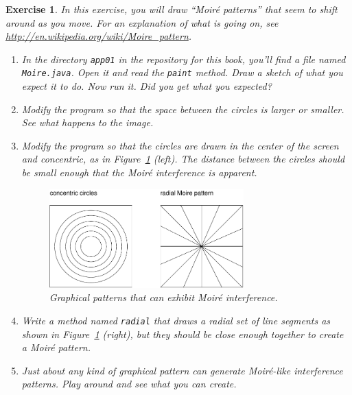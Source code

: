 \documentclass[12pt]{book}
\theoremstyle{exercise}
\newtheorem{exercise}{Exercise}[chapter]
\newcommand{\java}[1]{\verb"#1"}
\begin{document}
\begin{exercise}
In this exercise, you will draw ``Moir\'{e} patterns'' that seem to shift around as you move.
For an explanation of what is going on, see \url{http://en.wikipedia.org/wiki/Moire_pattern}.

\begin{enumerate}

\item In the directory {\tt app01} in the repository for this book, you'll find a file named {\tt Moire.java}.
Open it and read the {\tt paint} method.
Draw a sketch of what you expect it to do.
Now run it.
Did you get what you expected?

\item Modify the program so that the space between the circles is larger or smaller.
See what happens to the image.

\item Modify the program so that the circles are drawn in the center of the screen and concentric, as in Figure~\ref{fig.moire} (left).
The distance between the circles should be small enough that the Moir\'{e} interference is apparent.

\begin{figure}
\begin{center}
\includegraphics[height=1.5in]{figs/moire.pdf}
\caption{Graphical patterns that can exhibit Moir\'{e} interference.}
\label{fig.moire}
\end{center}
\end{figure}

\item Write a method named \java{radial} that draws a radial set of line segments as shown in Figure~\ref{fig.moire} (right), but they should be close enough together to create a Moir\'{e} pattern.

\item Just about any kind of graphical pattern can generate Moir\'{e}-like interference patterns.
Play around and see what you can create.

\end{enumerate}
\end{exercise}
\end{document}
